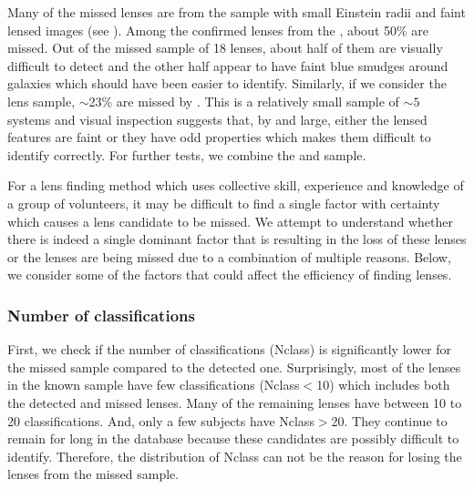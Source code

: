 \documentclass[useAMS,usenatbib,a4paper]{mn2e}
\begin{document}
Many of the missed lenses are from the \rf sample with small
Einstein radii and faint lensed images (see ). Among
the confirmed lenses from the \rf, about 50\% are missed. Out of the
missed sample of 18 lenses, about half of them are visually difficult to
detect and the other half appear to have faint blue smudges around
galaxies which should have been easier to identify. Similarly,
if we consider the \af lens sample, $\sim$23\% are missed by \sw. This
is a relatively small sample of $\sim 5$ systems and visual inspection
suggests that, by and large, either the lensed features are faint
or they have odd properties which makes them difficult to identify
correctly. For further tests, we combine the \rf and \af sample.

For a lens finding method which uses collective skill, experience and
knowledge of a group of volunteers, it may be difficult to find a single
factor with certainty which causes a lens candidate to be missed. We
attempt to understand whether there is indeed a single dominant factor
that is resulting in the loss of these lenses or the lenses are being
missed due to a combination of multiple reasons. Below, we consider some
of the factors that could affect the efficiency of finding lenses.

\subsubsection{Number of classifications}
First, we check if the number of classifications (Nclass) is
significantly lower for the missed sample compared to the detected one.
Surprisingly, most of the lenses in the known sample have few
classifications (Nclass$<$10) which includes both the detected and
missed lenses. Many of the remaining lenses have between 10 to 20
classifications. And, only a few subjects have Nclass$>$20. They
continue to remain for long in the database because these candidates are
possibly difficult to identify. Therefore, the distribution of Nclass
can not be the reason for losing the lenses from the missed sample.

\end{document}
